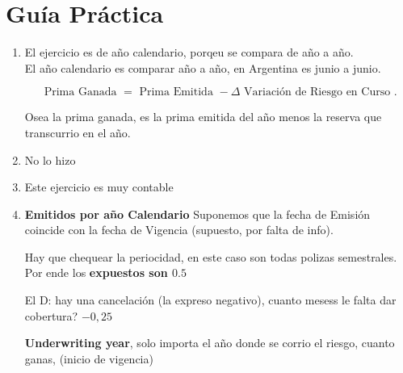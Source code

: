 

\section{Guía Práctica}

\begin{enumerate}
	\item  El ejercicio es de año calendario, porqeu se compara de año a año. \\[0.2cm] 

		El año calendario es comparar año a año, en Argentina es junio a junio.

		\[
			\text{ Prima Ganada }  = \text{ Prima Emitida }  - \Delta \text{ Variación de Riesgo en Curso } 
		.\] 	

		Osea la prima ganada, es la prima emitida del año menos la reserva que transcurrio en el año.  

	\item   No lo hizo

	\item  Este ejercicio es muy contable 

	\item \textbf{Emitidos por año Calendario}  Suponemos que la fecha de Emisión coincide con la fecha de Vigencia (supuesto, por falta de info).

	Hay que chequear la periocidad, en este caso son todas polizas semestrales. Por ende los \textbf{expuestos son $0.5$}		
	
	El D:  hay una cancelación (la expreso negativo), cuanto mesess le falta dar cobertura?  $-0,25$

	\textbf{Underwriting year}, solo importa el año donde se corrio el riesgo, cuanto ganas,  (inicio de vigencia)
	

\end{enumerate}

